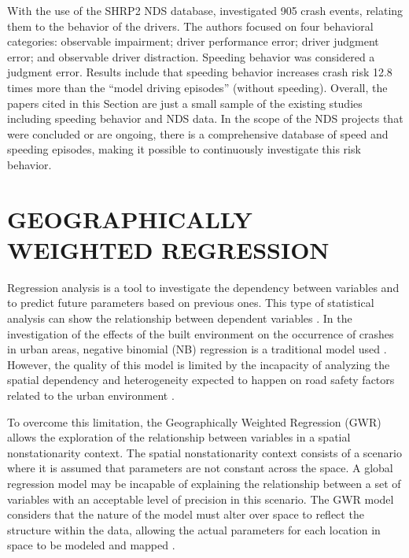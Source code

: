 With the use of the SHRP2 NDS database, \textcite{Dingus2016} investigated 905 crash events, relating them to the behavior of the drivers. The authors focused on four behavioral categories: observable impairment; driver performance error; driver judgment error; and observable driver distraction. Speeding behavior was considered a judgment error. Results include that speeding behavior increases crash risk 12.8 times more than the ``model driving episodes'' (without speeding). Overall, the papers cited in this Section are just a small sample of the existing studies including speeding behavior and NDS data. In the scope of the NDS projects that were concluded or are ongoing, there is a comprehensive database of speed and speeding episodes, making it possible to continuously investigate this risk behavior. 

\section{GEOGRAPHICALLY WEIGHTED REGRESSION} \label{sec:gwr}

Regression analysis is a tool to investigate the dependency between variables and to predict future parameters based on previous ones. This type of statistical analysis can show the relationship between dependent variables \cite{Lindley1987}. In the investigation of the effects of the built environment on the occurrence of crashes in urban areas, negative binomial (NB) regression is a traditional model used \cite{Wei2013, Zhang2014}. However, the quality of this model is limited by the incapacity of analyzing the spatial dependency and heterogeneity expected to happen on road safety factors related to the urban environment \cite{Obelheiro2019}.


To overcome this limitation, the Geographically Weighted Regression (GWR) allows the exploration of the relationship between variables in a spatial nonstationarity context. The spatial nonstationarity context consists of a scenario where it is assumed that parameters are not constant across the space. A global regression model may be incapable of explaining the relationship between a set of variables with an acceptable level of precision in this scenario. The GWR model considers that the nature of the model must alter over space to reflect the structure within the data, allowing the actual parameters for each location in space to be modeled and mapped \cite{Brunsdon2010}.


